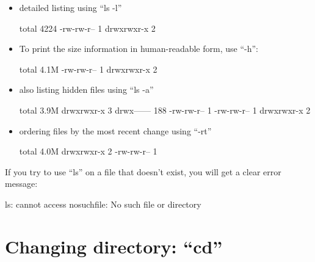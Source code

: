 \begin{itemize}
\item detailed listing using ``ls -l''

\begin{prompt}
total 4224
-rw-rw-r-- 1 %
drwxrwxr-x 2 %
\end{prompt}

\item To print the size information in human-readable form, use ``-h'':

\begin{prompt}
total 4.1M
-rw-rw-r-- 1 %
drwxrwxr-x 2 %
\end{prompt}

\item also listing hidden files using ``ls -a''

\begin{prompt}
total 3.9M
drwxrwxr-x   3 %
drwx------ 188 %
-rw-rw-r--   1 %
-rw-rw-r--   1 %
drwxrwxr-x   2 %
\end{prompt}

\item ordering files by the most recent change using ``-rt''

\begin{prompt}
total 4.0M
drwxrwxr-x 2 %
-rw-rw-r-- 1 %
\end{prompt}

\end{itemize}

If you try to use ``ls'' on a file that doesn't exist, you will get a clear error message:

\begin{prompt}
ls: cannot access nosuchfile: No such file or directory
\end{prompt}

\section{Changing directory: ``cd''}

